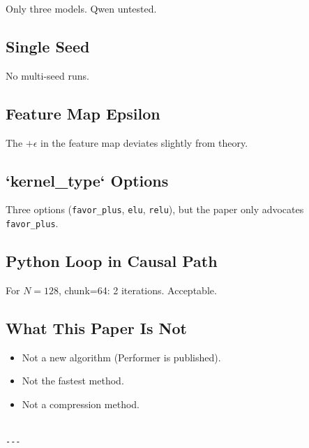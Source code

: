 Only three models. Qwen untested.

\subsection{Single Seed}

No multi-seed runs.

\subsection{Feature Map Epsilon}

The $+\epsilon$ in the feature map deviates slightly from theory.

\subsection{`kernel\_type` Options}

Three options (\texttt{favor\_plus}, \texttt{elu}, \texttt{relu}), but the paper only advocates 
\texttt{favor\_plus}.

\subsection{Python Loop in Causal Path}

For $N = 128$, chunk=64: 2 iterations. Acceptable.

\subsection{What This Paper Is Not}

\begin{itemize}
\item Not a new algorithm (Performer is published).
\item Not the fastest method.
\item Not a compression method.
\end{itemize}
\begin{lstlisting}

---
\end{lstlisting}